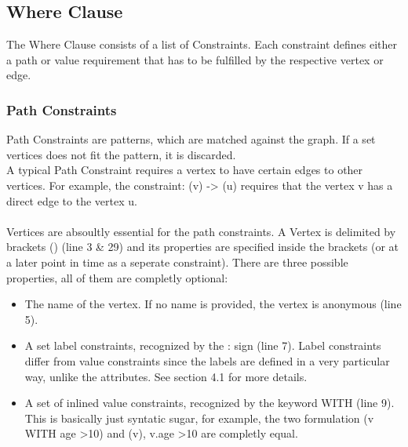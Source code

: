 \documentclass[11pt,singlecolumn]{scrartcl}
\begin{document}
\subsection{Where Clause}
The Where Clause consists of a list of Constraints. Each constraint defines either a path or value requirement that has to be fulfilled by the respective vertex or edge.
 
 \subsubsection{Path Constraints}
 Path Constraints are patterns, which are matched against the graph. If a set vertices does not fit the pattern, it is discarded.\\
 A typical Path Constraint requires a vertex to have certain edges to other vertices. For example, the constraint: (v) -> (u) requires that the vertex v has a direct edge to the vertex u.\\\\Vertices are absoultly essential for the path constraints. A Vertex is delimited by brackets () (line 3 \& 29) and its properties are specified inside the brackets (or at a later point in time as a seperate constraint). There are three possible properties, all of them are completly optional:\\
 \begin{itemize}
 \item The name of the vertex. If no name is provided, the vertex is anonymous (line 5).
 \item A set label constraints, recognized by the : sign (line 7). Label constraints differ from value constraints since the labels are defined in a very particular way, unlike the attributes. See section 4.1 for more details. 
 \item A set of inlined value constraints, recognized by the keyword WITH (line 9). This is basically just syntatic sugar, for example, the two formulation (v WITH age \textgreater 10) and (v), v.age \textgreater 10 are completly equal.
 \end{itemize}
 
\end{document}
